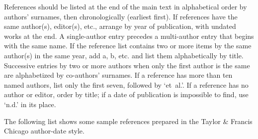 \documentclass[]{interact}
\theoremstyle{plain}%
\theoremstyle{definition}
\theoremstyle{remark}
\begin{document}
References should be listed at the end of the main text in alphabetical order by authors' surnames, then chronologically (earliest first).
If references have the same author(s), editor(s), etc., arrange by year of publication, with undated works at the end.
A single-author entry precedes a multi-author entry that begins with the same name.
If the reference list contains two or more items by the same author(s) in the same year, add a, b, etc. and list them alphabetically by title.
Successive entries by two or more authors when only the first author is the same are alphabetized by co-authors' surnames.
If a reference has more than ten named authors, list only the first seven, followed by `et~al.'.
If a reference has no author or editor, order by title; if a date of publication is impossible to find, use `n.d.' in its place.

The following list shows some sample references prepared in the Taylor \& Francis Chicago author-date style.



\end{document}
